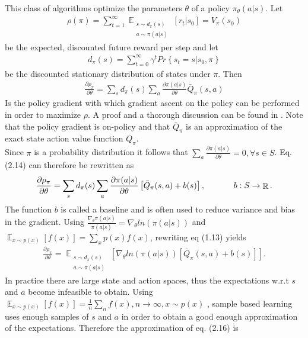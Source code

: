 This class of algorithms optimize the parameters $\theta$ of a policy $\pi_\theta(a|s)$. Let 
\begin{align}
\rho(\pi) = \sum_{t=1}^{\infty}\mathop{\mathbb{E}}_{\substack{s\sim d_\pi(s) \\ a\sim \pi(a|s)}} \left[ r_t|s_0 \right] = V_\pi(s_0)
\end{align}
be the expected, discounted future reward per step and let
\begin{align}
d_\pi(s) = \sum_{t=0}^\infty \gamma^t Pr\left\{s_t=s|s_0, \pi\right\}
\end{align}
be the discounted stationary distribution of states under $\pi$. Then
\begin{align}
\frac{\partial\rho_\pi}{\partial\theta} = \sum_s d_\pi(s)\sum_a \frac{\partial\pi(a|s)}{\partial\theta} \bar{Q}_\pi(s,a)
\end{align}
Is the policy gradient with which gradient ascent on the policy can be performed in order to maximize $\rho$. A proof and a thorough discussion can be found in \cite{PGBS}. Note that the policy gradient is on-policy and that $\bar{Q}_\pi$ is an approximation of the exact state action value function $Q_\pi$.\\
Since $\pi$ is a probability distribution it follows that $\sum_a\frac{\partial\pi(a|s)}{\partial\theta}=0, \forall s \in S$. Eq. (2.14) can therefore be rewritten as
\begin{align}
\frac{\partial\rho_\pi}{\partial\theta} = \sum_s d_\pi(s)\sum_a \frac{\partial\pi(a|s)}{\partial\theta}\left[ \bar{Q}_\pi(s,a)+b(s)\right],\text{\hspace{12mm}} b:S\rightarrow \mathop{\mathbb{R}}.
\end{align}
The function $b$ is called a baseline and is often used to reduce variance and bias in the gradient. Using $\frac{\nabla_\theta\pi(a|s)}{\pi(a|s)} = \nabla_\theta ln(\pi(a|s))$ and $\mathop{\mathbb{E}}_{x\sim p(x)}[f(x)] = \sum_{x}p(x)f(x)$, rewriting eq (1.13) yields
\begin{align}
\frac{\partial\rho_\pi}{\partial\theta} = \mathop{\mathbb{E}}_{\substack{s\sim d_\pi(s) \\ a\sim \pi(a|s)}}\left[ \nabla_\theta ln (\pi(a|s))\left[ \bar{Q}_\pi(s,a)+b(s)\right]\right].
\end{align}
In practice there are large state and action spaces, thus the expectations w.r.t $s$ and $a$ become infeasible to obtain. Using $\mathop{\mathbb{E}}_{x\sim p(x)}[f(x)] = \frac{1}{n}\sum_{n}f(x), n\rightarrow\infty, x\sim p(x)$ , sample based learning uses enough samples of $s$ and $a$ in order to obtain a good enough approximation of the expectations. Therefore the approximation of eq. (2.16) is

